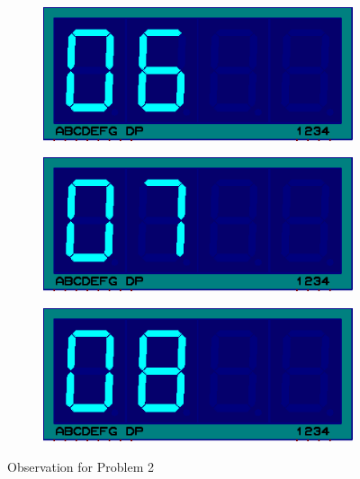 \documentclass{lab_sheet}
\begin{document}
\begin{figure}[H]
\begin{subfigure}{.33\textwidth}
        \centering
        \includegraphics[frame,width=.9\linewidth]{../Figures/d6}   
        \caption{}
        \label{fig:prob2-g}
      \end{subfigure}
      \begin{subfigure}{.33\textwidth}
        \centering
        \includegraphics[frame,width=.9\linewidth]{../Figures/d7}   
        \caption{}
        \label{fig:prob2-h}
      \end{subfigure}
      \begin{subfigure}{.33\textwidth}
        \centering
        \includegraphics[frame,width=.9\linewidth]{../Figures/d8}   
        \caption{}
        \label{fig:prob2-i}
      \end{subfigure}
    \caption{Observation for Problem 2}
    \label{fig:prob2}
    \end{figure}
\end{document}
